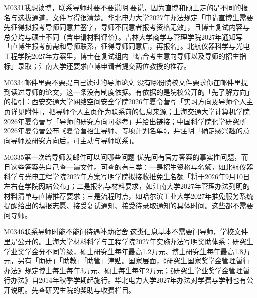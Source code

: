 \begin{qa}{M0331}{我想读博，联系导师时要不要说明}
要说，因为直博和硕士走的是不同的报名与选拔通道，文件写得很清楚。华北电力大学2027年办法规定「申请直博生需要先征得拟报考导师同意并签字，导师不同意者报考资格无效」，且博士复试内容与总分均与硕士不同（含申请材料评价）。吉林大学商学与管理学院2027年通知写「直博生报考前需和导师联系，征得导师同意后，再报名」。北航仪器科学与光电工程学院2027年方案里，博士在复试组内「结合考生意向导师以及导师的招生指标」录取；江南大学还要求直博申请者提交两位教授的推荐。
\end{qa}

\begin{qa}{M0334}{邮件里要不要提自己读过的导师论文}
没有哪份院校文件要求你在邮件里提到读过导师的论文，这一条没有制度依据。有依据的是院校公开的「先了解方向」的指引：西安交通大学网络空间安全学院2026年夏令营写「实习方向及导师个人主页详见附件」，把导师个人主页作为联系前的信息来源；上海交通大学计算机学院2026年夏令营写「导师的研究方向可参考」并给出链接；中国科学院化学研究所2026年夏令营公布《夏令营招生导师、专项计划名单》，并注明「确定感兴趣的意向导师及研究方向后，可主动与导师联系」。
\end{qa}

\begin{qa}{M0335}{第一次给导师发邮件可以问哪些问题}
优先问有官方答案的事实性问题，而且这些答案先自己查一遍文件。可查的有三类：一是招生资格与名额，如北航仪器科学与光电工程学院2027年方案写明学院拟接收推免生名额「将于2026年9月10日左右在学院网站公布」；二是报名与材料要求，如江南大学2027年管理办法列明的材料清单与直博推荐要求；三是流程时点，如哈尔滨工业大学2027年推免服务系统提醒给出的填报志愿、接受复试通知、接受待录取通知的具体时间。这些都不需要问导师。
\end{qa}

\begin{qa}{M0346}{联系导师时能不能问待遇补助宿舍}
这类信息基本不需要问导师，学校文件里是公开的。上海大学材料科学与工程学院2027年实施办法写明奖助体系：研究生学业奖学金分不同等级，硕士研究生每年最高1.2万元、博士研究生每年最高1.8万元，另有「助研」「助教」「助管」津贴。国家层面，《研究生国家奖学金管理暂行办法》规定博士每生每年3万元、硕士每生每年2万元；《研究生学业奖学金管理暂行办法》自2014年秋季学期起施行。华北电力大学2027年办法对学费与学制也有公开说明。先查研究生院的奖助与收费栏目。
\end{qa}

